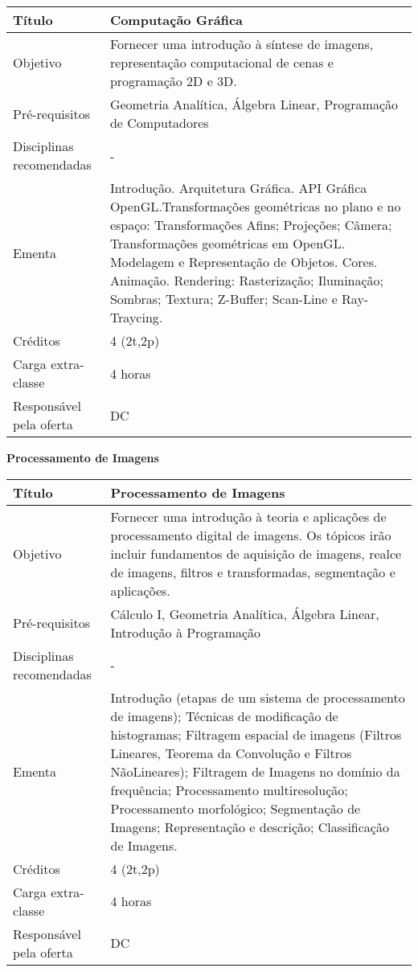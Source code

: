 \begin{tabular}{|p{4.5cm}|p{10.0cm}|} \hline

Título & Computação Gráfica \\ \hline
Objetivo & Fornecer uma introdução à síntese de imagens, representação computacional de cenas e programação 2D e 3D. \\ \hline
Pré-requisitos &  Geometria Analítica, Álgebra Linear, Programação de Computadores \\ \hline
Disciplinas recomendadas & - \\ \hline
Ementa & Introdução. Arquitetura Gráfica. API Gráfica OpenGL.Transformações geométricas no plano e no espaço: Transformações Afins; Projeções; Câmera; Transformações geométricas em OpenGL. Modelagem e Representação de Objetos. Cores. Animação. Rendering: Rasterização; Iluminação; Sombras; Textura; Z-Buffer; Scan-Line e Ray-Traycing. \\ \hline
Créditos & 4 (2t,2p) \\ \hline
Carga extra-classe & 4 horas \\ \hline
Responsável pela oferta & DC \\ \hline
\end{tabular}


\textbf{Processamento de Imagens}


\begin{tabular}{|p{4.5cm}|p{10.0cm}|} \hline

Título & Processamento de Imagens \\ \hline
Objetivo & Fornecer uma introdução à teoria e aplicações de processamento digital de imagens. Os tópicos irão incluir fundamentos de aquisição de imagens, realce de imagens, filtros e transformadas, segmentação e aplicações. \\ \hline
Pré-requisitos &  Cálculo I, Geometria Analítica, Álgebra Linear, Introdução à Programação \\ \hline
Disciplinas recomendadas & - \\ \hline
Ementa & Introdução (etapas de um sistema de processamento de imagens); Técnicas de modificação de histogramas; Filtragem espacial de imagens (Filtros Lineares, Teorema da Convolução e Filtros NãoLineares); Filtragem de Imagens no domínio da frequência; Processamento multiresolução; Processamento morfológico; Segmentação de Imagens; Representação e descrição; Classificação de Imagens. \\ \hline
Créditos & 4 (2t,2p) \\ \hline
Carga extra-classe & 4 horas \\ \hline
Responsável pela oferta & DC \\ \hline
\end{tabular}

